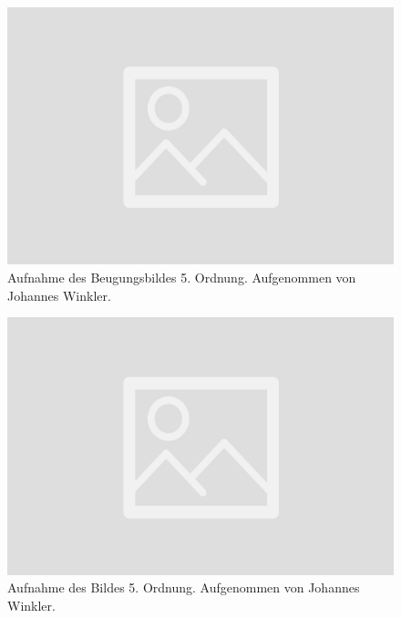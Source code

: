 \documentclass{article}
\begin{document}
\begin{minipage}[t]{.45\textwidth}
\begin{figure}[H]
\includegraphics[scale=0.1]{jw/Beugungsbild_5.jpg}
\caption{Aufnahme des Beugungsbildes 5. Ordnung. Aufgenommen von Johannes Winkler.}
\label{fig:bbild_5_jw}
\end{figure}
\end{minipage}
\hfill
\noindent
\begin{minipage}[t]{.45\textwidth}
\begin{figure}[H]
\includegraphics[scale=0.1]{jw/Bild_5.jpg}
\caption{Aufnahme des Bildes 5. Ordnung. Aufgenommen von Johannes Winkler.}\label{fig:bild_5_jw}
\end{figure}
\end{minipage}
\end{document}
